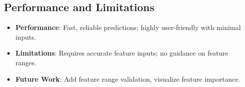 \documentclass[a4paper,12pt]{article}
\begin{document}
\subsection{Performance and Limitations}
\begin{itemize}[noitemsep]
    \item \textbf{Performance}: Fast, reliable predictions; highly user-friendly with minimal inputs.
    \item \textbf{Limitations}: Requires accurate feature inputs; no guidance on feature ranges.
    \item \textbf{Future Work}: Add feature range validation, visualize feature importance.
\end{itemize}

\end{document}
